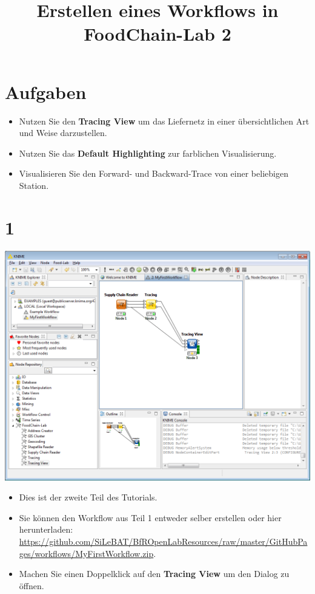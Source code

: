 \documentclass{beamer}
\title{Erstellen eines Workflows in FoodChain-Lab 2}
\date{}
\begin{document}
\maketitle

\section{Aufgaben}
\begin{frame}
	\begin{itemize}
		\item Nutzen Sie den \textbf{Tracing View} um das Liefernetz in einer übersichtlichen Art und Weise darzustellen.
		\item Nutzen Sie das \textbf{Default Highlighting} zur farblichen Visualisierung.
		\item Visualisieren Sie den Forward- und Backward-Trace von einer beliebigen Station.
	\end{itemize}
\end{frame}
 
\section{1}
\begin{frame}
	\begin{center}
  		\includegraphics[height=0.5\textheight]{1.png}
	\end{center}
	\begin{itemize}
		\item Dies ist der zweite Teil des Tutorials.
		\item Sie können den Workflow aus Teil 1 entweder selber erstellen oder hier herunterladen: \url{https://github.com/SiLeBAT/BfROpenLabResources/raw/master/GitHubPages/workflows/MyFirstWorkflow.zip}.
		\item Machen Sie einen Doppelklick auf den \textbf{Tracing View} um den Dialog zu öffnen.
	\end{itemize}
\end{frame}
\end{document}
